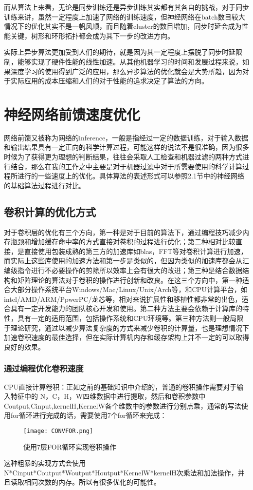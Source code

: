 而从算法上来看，无论是同步训练还是异步训练其实都有其各自的挑战，对于同步训练来讲，虽然一定程度上加速了网络的训练速度，但神经网络在batch数目较大情况下的优化其实不是一帆风顺，而且随着cluster的数目增加，同步时延会成为性能关键，树形和环形拓扑都会成为其下一步的改进方向。

实际上异步算法更加受到人们的期待，就是因为其一定程度上摆脱了同步时延限制，能够实现了硬件性能的线性加速。从其他机器学习的时间和发展过程来说，如果深度学习的使用得到广泛的应用，那么异步算法的优化就会是大势所趋，因为对于实际应用的成本压缩和人们的对于性能的追求决定了算法的方向。

\section{神经网络前馈速度优化}
网络前馈又被称为网络的inference，一般是指经过一定的数据训练，对于输入数据和输出结果具有一定正向的科学计算过程，可能这样的说法不是很准确，因为很多时候为了获得更为理想的判断结果，往往会采取人工检查和机器过滤的两种方式进行结合，那么在我的工作之中主要是对于机器过滤中对于所需要使用的科学计算过程所进行的一些速度上的优化。具体算法的表述形式可以参照2.1节中的神经网络的基础算法过程进行对比。
\subsection{卷积计算的优化方式}
对于卷积层的优化有三个方向，第一种是对于目前的算法下，通过编程技巧减少内存瓶颈和增加缓存命中率的方式直接对卷积的过程进行优化；第二种相对比较直接，是直接使用包装成熟的第三方的加速库如blas，FFT等对卷积计算进行加速，而实际上这些库使用的加速方法和第一步是类似的，但因为类似的加速库都会从汇编级指令进行不必要操作的剪除所以效率上会有很大的改进；第三种是结合数据结构和矩阵理论的算法对于卷积的操作进行创新和改良。在这三个方向中，第一种适合大部分操作系统平台Windows/Mac/Linux/Unix/Arch等，和CPU计算平台，如intel/AMD/ARM/PpwerPC/龙芯等，相对来说扩展性和移植性都非常的出色，适合具有一定开发能力的团队核心开发和使用。第二种方法主要会依赖于计算库的特性，具有一定的适用范围，包括操作系统和CPU环境等。第三种方法则一般局限于理论研究，通过以减少算法复杂度的方式来减少卷积的计算量，也是理想情况下加速卷积速度的最佳选择，但在实际计算机内存和缓存架构上并不一定的可以取得良好的效果。
\subsubsection{通过编程优化卷积速度}
CPU直接计算卷积：正如之前的基础知识中介绍的，普通的卷积操作需要对于输入特征中的 N，C，H，W四维数据中进行提取，然后和卷积参数中Coutput,Cinput,kernelH,KernelW各个维数中的参数进行分别点乘，通常的写法使用for循环进行完成的话，需要使用7个for循环来完成：
\begin{figure}
\texttt{[image: CONVFOR.png]}
\caption{使用7层FOR循环实现卷积操作}
\end{figure}
这种粗暴的实现方式会使用N*Cinput*Coutput*Woutput*Houtput*KernelW*kernelH次乘法和加法操作，并且读取相同次数的内存。所以有很多优化的可能性。

